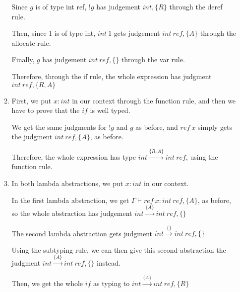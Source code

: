 \begin{enumerate}[label=(\alph*)]
\begin{enumerate}[label=(\roman*)]
       Since $g$ is of type int ref, $!g$ has judgement $int, \{R\}$ through the deref rule.

       Then, since 1 is of type int, $int\ 1$ gets judgement $int\ ref, \{A\}$ through the allocate rule.

       Finally, $g$ has judgement $int\ ref, \{\}$ through the var rule.

       Therefore, through the if rule, the whole expression has judgment $int\ ref, \{R,A\}$

       \item
         First, we put $x: int$ in our context through the function rule, and then we have to prove that the $if$ is well typed.

         We get the same judgments for $!g$ and $g$ as before, and $ref\ x$ simply gets the judgment $int\ ref, \{A\}$, as before.

         Therefore, the whole expression has type $int \xrightarrow{\{R,A\}} int\ ref$, using the function rule.

         \item
           In both lambda abstractions, we put $x: int$ in our context.

           In the first lambda abstraction, we get $\Gamma \vdash ref\ x: int\ ref, \{A\}$, as before, so the whole abstraction has judgement $int \xrightarrow{\{A\}} int\ ref, \{\}$

           The second lambda abstraction gets judgment $int \xrightarrow{\{\}} int\ ref, \{\}$

           Using the subtyping rule, we can then give this second abstraction the judgment $int \xrightarrow{\{A\}} int\ ref, \{\}$ instead.

         Then, we get the whole $if$ as typing to $int \xrightarrow{\{A\}} int\ ref, \{R\}$
       \end{enumerate}



        
    \end{enumerate}

